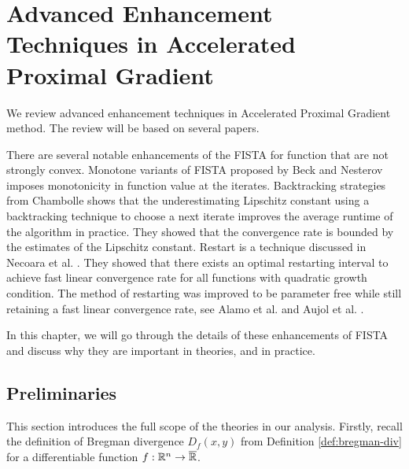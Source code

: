 \documentclass[12pt]{report}
\begin{document}
\chapter{Advanced Enhancement Techniques in Accelerated Proximal Gradient}
    We review advanced enhancement techniques in Accelerated Proximal Gradient method. 
    The review will be based on several papers. 
    \par
    There are several notable enhancements of the FISTA for function that are not strongly convex. 
    Monotone variants of FISTA proposed by Beck \cite{beck_fast_2009-1} and Nesterov \cite[2.2.32]{nesterov_lectures_2018} imposes monotonicity in function value at the iterates.  
    Backtracking strategies from Chambolle \cite{calatroni_backtracking_2019} shows that the underestimating Lipschitz constant using a backtracking technique to choose a next iterate improves the average runtime of the algorithm in practice. 
    They showed that the convergence rate is bounded by the estimates of the Lipschitz constant. 
    Restart is a technique discussed in Necoara et al. \cite{necoara_linear_2019}.
    They showed that there exists an optimal restarting interval to achieve fast linear convergence rate for all functions with quadratic growth condition. 
    The method of restarting was improved to be parameter free while still retaining a fast linear convergence rate, see Alamo et al. \cite{alamo_restart_2019} and Aujol et al. \cite{aujol_parameter-free_2024}. 
    \par
    In this chapter, we will go through the details of these enhancements of FISTA and discuss why they are important in theories, and in practice. 
    
    \section{Preliminaries}
        This section introduces the full scope of the theories in our analysis. 
        Firstly, recall the definition of Bregman divergence $D_f(x, y)$ from Definition \ref{def:bregman-div} for a differentiable function $f:\mathbb R^n \rightarrow \overline {\mathbb R}$. 
\end{document}
